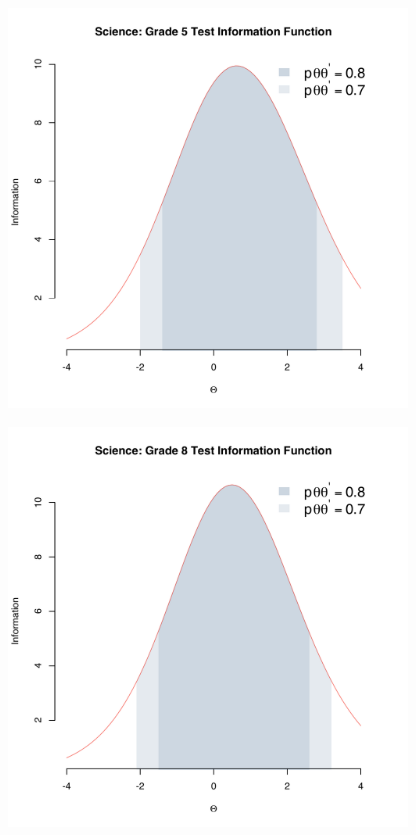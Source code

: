 \documentclass[]{article}
\begin{document}
\begin{figure}
\centering
\includegraphics[height=4.16667in]{tifs/science5tif.pdf}
\caption{}
\end{figure}

\begin{figure}
\centering
\includegraphics[height=4.16667in]{tifs/science8tif.pdf}
\caption{}
\end{figure}
\end{document}
